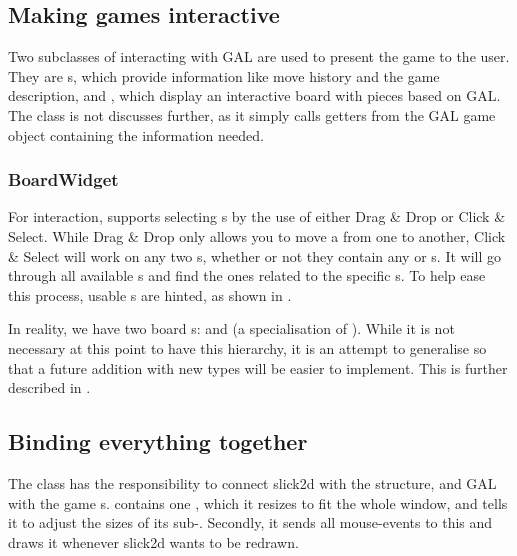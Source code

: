 \subsection{Making games interactive}
\label{sec:interaction}

Two subclasses of  interacting with GAL are used to
present the game to the user. They are s, which
provide information like move history and the game description, and
, which display an interactive board with pieces
based on GAL. The class  is not discusses
further, as it simply calls getters from the GAL game object containing
the information needed.

\subsubsection{BoardWidget}
For interaction,  supports selecting
s by the use of either Drag \& Drop or Click \& Select.
While Drag \& Drop only allows you to move a  from one
 to another, Click \& Select will work on any two
s, whether or not they contain any  or
s. It will go through all available s
and find the ones related to the specific s. To help
ease this process, usable s are hinted, as shown in
.


In reality, we have two board s: 
and  (a specialisation of
). While it is not necessary at this point to have
this hierarchy, it is an attempt to generalise  so
that a future addition with new  types will be easier to
implement. This is further described in .

\subsection{Binding everything together}
\label{sec:connection}

The class  has the responsibility to connect
slick2d with the  structure, and GAL with the
game s.  contains one
, which it resizes to fit the whole window, and
tells it to adjust the sizes of its sub-. Secondly, it
sends all mouse-events to this  and draws it whenever
slick2d wants to be redrawn.

